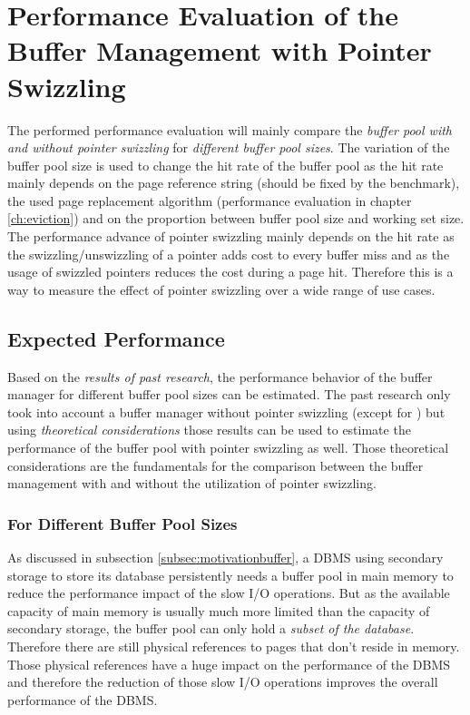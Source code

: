 \chapter[Performance Evaluation of Pointer Swizzling]{Performance Evaluation of the Buffer Management with Pointer Swizzling} \label{ch:performance}

    The performed performance evaluation will mainly compare the \emph{buffer pool with and without pointer swizzling} for \emph{different buffer pool sizes}. The variation of the buffer pool size is used to change the hit rate of the buffer pool as the hit rate mainly depends on the page reference string (should be fixed by the benchmark), the used page replacement algorithm (performance evaluation in chapter \ref{ch:eviction}) and on the proportion between buffer pool size and working set size. The performance advance of pointer swizzling mainly depends on the hit rate as the swizzling/unswizzling of a pointer adds cost to every buffer miss and as the usage of swizzled pointers reduces the cost during a page hit. Therefore this is a way to measure the effect of pointer swizzling over a wide range of use cases.

\section{Expected Performance}

    Based on the \emph{results of past research}, the performance behavior of the buffer manager for different buffer pool sizes can be estimated. The past research only took into account a buffer manager without pointer swizzling (except for \cite{Graefe:2014}) but using \emph{theoretical considerations} those results can be used to estimate the performance of the buffer pool with pointer swizzling as well. Those theoretical considerations are the fundamentals for the comparison between the buffer management with and without the utilization of pointer swizzling.

\subsection{For Different Buffer Pool Sizes} \label{subsec:reasonhitrate}

    As discussed in subsection \ref{subsec:motivationbuffer}, a DBMS using secondary storage to store its database persistently needs a buffer pool in main memory to reduce the performance impact of the slow I/O operations. But as the available capacity of main memory is usually much more limited than the capacity of secondary storage, the buffer pool can only hold a \emph{subset of the database}. Therefore there are still physical references to pages that don't reside in memory. Those physical references have a huge impact on the performance of the DBMS and therefore the reduction of those slow I/O operations improves the overall performance of the DBMS.

